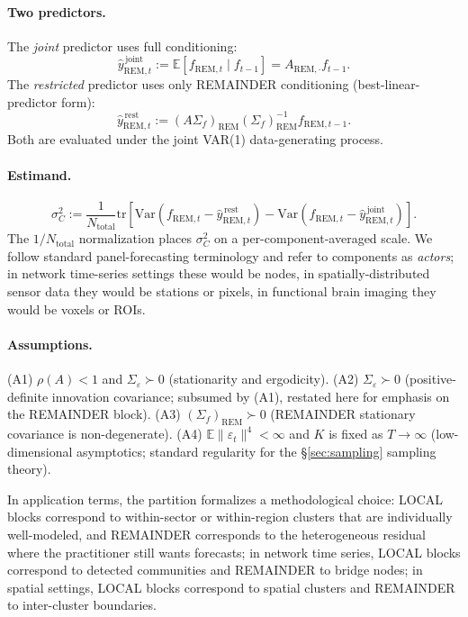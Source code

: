 \documentclass[11pt,letterpaper]{article}
\theoremstyle{remark}
\newcommand{\REM}{\mathrm{REM}}
\newcommand{\Ntot}{N_{\mathrm{total}}}
\newcommand{\trace}{\mathrm{tr}}
\newcommand{\Var}{\mathrm{Var}}
\newcommand{\E}{\mathbb{E}}
\begin{document}
\paragraph{Two predictors.} The \emph{joint} predictor uses full conditioning:
\begin{equation*}
\widehat{y}^{\,\mathrm{joint}}_{\REM, t} := \E[f_{\REM, t} \mid f_{t-1}] = A_{\REM, \cdot} f_{t-1}.
\end{equation*}
The \emph{restricted} predictor uses only REMAINDER conditioning (best-linear-predictor form):
\begin{equation*}
\widehat{y}^{\,\mathrm{rest}}_{\REM, t} := (A \Sigma_f)_\REM (\Sigma_f)_\REM^{-1} f_{\REM, t-1}.
\end{equation*}
Both are evaluated under the joint VAR(1) data-generating process.

\paragraph{Estimand.}
\begin{equation}\label{eq:estimand}
\sigma^2_C := \frac{1}{\Ntot} \trace\!\left[\Var\!\left(f_{\REM, t} - \widehat{y}^{\,\mathrm{rest}}_{\REM, t}\right) - \Var\!\left(f_{\REM, t} - \widehat{y}^{\,\mathrm{joint}}_{\REM, t}\right)\right].
\end{equation}
The $1/\Ntot$ normalization places $\sigma^2_C$ on a per-component-averaged scale. We follow standard panel-forecasting terminology and refer to components as \emph{actors}; in network time-series settings these would be nodes, in spatially-distributed sensor data they would be stations or pixels, in functional brain imaging they would be voxels or ROIs.

\paragraph{Assumptions.} (A1) $\rho(A) < 1$ and $\Sigma_\varepsilon \succ 0$ (stationarity and ergodicity). (A2) $\Sigma_\varepsilon \succ 0$ (positive-definite innovation covariance; subsumed by (A1), restated here for emphasis on the REMAINDER block). (A3) $(\Sigma_f)_\REM \succ 0$ (REMAINDER stationary covariance is non-degenerate). (A4) $\E\|\varepsilon_t\|^4 < \infty$ and $K$ is fixed as $T \to \infty$ (low-dimensional asymptotics; standard regularity for the \S\ref{sec:sampling} sampling theory).

In application terms, the partition formalizes a methodological choice: LOCAL blocks correspond to within-sector or within-region clusters that are individually well-modeled, and REMAINDER corresponds to the heterogeneous residual where the practitioner still wants forecasts; in network time series, LOCAL blocks correspond to detected communities and REMAINDER to bridge nodes; in spatial settings, LOCAL blocks correspond to spatial clusters and REMAINDER to inter-cluster boundaries.
\end{document}
